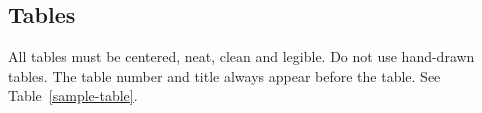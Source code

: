 \documentclass{article} %
\begin{document}
\subsection{Tables}

All tables must be centered, neat, clean and legible. Do not use hand-drawn
tables. The table number and title always appear before the table. See
Table~\ref{sample-table}.




{\small


}
\end{document}
